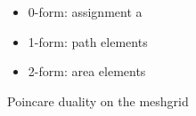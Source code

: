 \begin{itemize}
\item 0-form: assignment a
\item 1-form: path elements
\item 2-form: area elements
\end{itemize}

Poincare duality on the meshgrid
